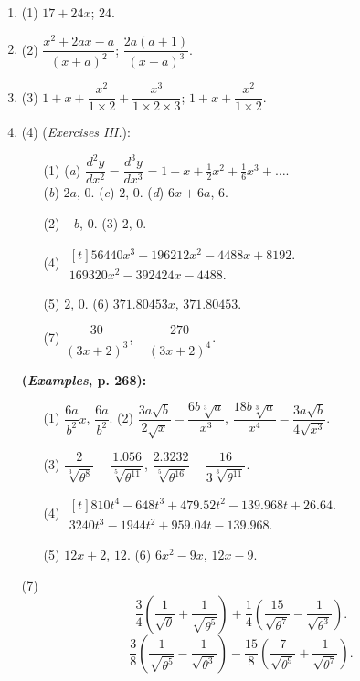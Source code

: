 \documentclass[a4paper,11pt,openany]{ltjsbook}
\begin{document}
\begin{enumerate}
\item (1) \(17 + 24x\); \quad \(24\).
\item (2) \(\dfrac{x^2 + 2ax - a}{(x + a)^2}\); \quad \(\dfrac{2a(a + 1)}{(x + a)^3}\).
\item (3) \(1 + x + \dfrac{x^2}{1 \times  2} + \dfrac{x^3}{1 \times  2 \times  3}\); \quad \(1 + x + \dfrac{x^2}{1 \times  2}\).
\item (4) (\textit{Exercises III.}):
\begin{itemize}
\item[(1)] (\textit{a}) \(\dfrac{d^2 y}{dx^2} = \dfrac{d^3 y}{dx^3} = 1 + x + \frac{1}{2}x^2 + \frac{1}{6} x^3 + \ldots\). \\
  (\textit{b}) \(2a\), \(0\). \hfil
  (\textit{c}) \(2\), \(0\). \hfil
  (\textit{d}) \(6x + 6a\), \(6\).
\item[(2)] \(-b\), \(0\). \hfil (3) \(2\), \(0\). \hfil
\item[(4)] \(\begin{gathered}[t]
    56440x^3 - 196212x^2 - 4488x + 8192. \\
    169320x^2 - 392424x - 4488.
    \end{gathered}\)
\item[(5)] \(2\), \(0\). \hfil (6) \(371.80453x\), \(371.80453\). \hfil
\item[(7)] \(\dfrac{30}{(3x + 2)^3}\), \quad \(-\dfrac{270}{(3x + 2)^4}\).
\end{itemize}
\par\medskip\noindent\textbf{\normalfont(\textit{Examples}, p. 268):}
\begin{itemize}
\item[(1)] \(\dfrac{6a}{b^2} x\), \quad \(\dfrac{6a}{b^2}\). \hfil
(2) \(\dfrac{3a \sqrt{b}} {2 \sqrt{x}} - \dfrac{6b \sqrt[3]{a}}{x^3}\), \quad
\(\dfrac{18b \sqrt[3]{a}}{x^4} - \dfrac{3a \sqrt{b}}{4 \sqrt{x^3}}\).
\item[(3)] \(\dfrac{2}{\sqrt[3]{\theta^8}} - \dfrac{1.056}{\sqrt[5]{\theta^{11}}}\), \quad
\(\dfrac{2.3232}{\sqrt[5]{\theta^{16}}} - \dfrac{16}{3 \sqrt[3]{\theta^{11}}}\).
\item[(4)] \(\begin{gathered}[t]
  810t^4 - 648t^3 + 479.52t^2 - 139.968t + 26.64. \\
  3240t^3 - 1944t^2 + 959.04t - 139.968.
  \end{gathered}\)
\item[(5)] \(12x + 2\), \(12\). \hfil
(6) \(6x^2 - 9x\), \quad \(12x - 9\). \hfil
\end{itemize}
\item[(7)]
\[
\frac{3}{4} \left( \frac{1}{\sqrt{\theta}} + \frac{1}{\sqrt{\theta^5}} \right)
+ \frac{1}{4} \left( \frac{15}{\sqrt{\theta^7}} - \frac{1}{\sqrt{\theta^3}} \right).
\]
\[
\frac{3}{8} \left( \frac{1}{\sqrt{\theta^5}} - \frac{1}{\sqrt{\theta^3}} \right)
- \frac{15}{8} \left( \frac{7}{\sqrt{\theta^9}} + \frac{1}{\sqrt{\theta^7}} \right).
\]


\end{enumerate}
\end{document}

